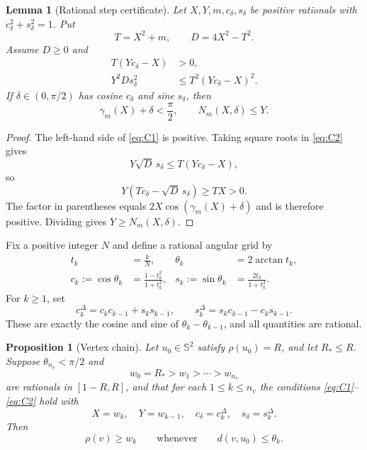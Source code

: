 \documentclass[11pt,reqno]{amsart}
\numberwithin{equation}{section}
\newtheorem{proposition}[theorem]{Proposition}
\newtheorem{lemma}[theorem]{Lemma}
\theoremstyle{definition}
\theoremstyle{remark}
\newcommand{\Sph}{\mathbb{S}^{2}}
\begin{document}
\begin{lemma}[Rational step certificate]\label{lem:rational-step}
Let $X,Y,m,c_{\delta},s_{\delta}$ be positive rationals with
$c_{\delta}^{2}+s_{\delta}^{2}=1$. Put
\[
 T=X^{2}+m,
 \qquad
 D=4X^{2}-T^{2}.
\]
Assume $D\geq0$ and
\begin{align}
 T(Yc_{\delta}-X)&>0, \label{eq:C1}\\
 Y^{2}D s_{\delta}^{2}&\leq T^{2}(Yc_{\delta}-X)^{2}. \label{eq:C2}
\end{align}
If $\delta\in(0,\pi/2)$ has cosine $c_{\delta}$ and sine $s_{\delta}$, then
\[
 \gamma_m(X)+\delta<\frac\pi2,
 \qquad
 N_m(X,\delta)\leq Y.
\]
\end{lemma}

\begin{proof}
The left-hand side of \eqref{eq:C1} is positive. Taking square roots in \eqref{eq:C2} gives
\[
 Y\sqrt D\,s_{\delta}\leq T(Yc_{\delta}-X),
\]
so
\[
 Y(Tc_{\delta}-\sqrt D\,s_{\delta})\geq TX>0.
\]
The factor in parentheses equals $2X\cos(\gamma_m(X)+\delta)$ and is therefore positive. Dividing gives $Y\geq N_m(X,\delta)$.
\end{proof}

Fix a positive integer $N$ and define a rational angular grid by
\begin{equation}\label{eq:angular-grid}
 \begin{aligned}
 t_k&=\frac{k}{N}, & \theta_k&=2\arctan t_k,\\
 c_k:=\cos\theta_k&=\frac{1-t_k^{2}}{1+t_k^{2}}, &
 s_k:=\sin\theta_k&=\frac{2t_k}{1+t_k^{2}}.
 \end{aligned}
\end{equation}
For $k\geq1$, set
\begin{equation}\label{eq:step-trig}
 c_k^{\Delta}=c_kc_{k-1}+s_ks_{k-1},
 \qquad
 s_k^{\Delta}=s_kc_{k-1}-c_ks_{k-1}.
\end{equation}
These are exactly the cosine and sine of $\theta_k-\theta_{k-1}$, and all quantities are rational.

\begin{proposition}[Vertex chain]\label{prop:vertex-chain}
Let $u_0\in\Sph$ satisfy $\rho(u_0)=R$, and let $R_{*}\leq R$. Suppose
$\theta_{n_v}<\pi/2$ and
\[
 w_0=R_{*}>w_1>\cdots>w_{n_v}
\]
are rationals in $[1-R,R]$, and that for each $1\leq k\leq n_v$ the conditions \eqref{eq:C1}--\eqref{eq:C2} hold with
\[
 X=w_k,
 \quad Y=w_{k-1},
 \quad c_{\delta}=c_k^{\Delta},
 \quad s_{\delta}=s_k^{\Delta}.
\]
Then
\begin{equation}\label{eq:vertex-cap-bound}
 \rho(v)\geq w_k
 \qquad\text{whenever}\qquad
 d(v,u_0)\leq\theta_k.
\end{equation}
\end{proposition}
\end{document}
